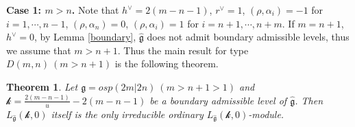 \documentclass[12pt]{article}
\newtheorem{thm}{Theorem}[section]
\begin{document}
{\bf Case 1: $m>n$.}
Note that $h^{\vee}=2(m-n-1)$, $r^\vee=1$,
$(\rho, \alpha_i)=-1$ for $i=1,\cdots,n-1$, $(\rho, \alpha_n)=0$,
$(\rho, \alpha_i)=1$ for $i=n+1,\cdots,n+m$.
If $m=n+1$, $h^{\vee}=0$, by Lemma \ref{boundary}, $\widehat{\mathfrak{g}}$ does not admit boundary admissible levels,
thus we assume that $m>n+1$.
Thus the main result for type $D(m,n)~(m>n+1)$ is the following theorem.
\begin{thm}
Let $\mathfrak{g}=osp(2m|2n)~(m>n+1>1)$ and
$\mathcal{k}=\frac{2(m-n-1)}{u}-2(m-n-1)$ be a boundary admissible level of $\widehat{\mathfrak{g}}$.
Then $L_{\widehat{\mathfrak{g}}}(\mathcal{k},0)$ itself is the only irreducible ordinary $L_{\widehat{\mathfrak{g}}}(\mathcal{k},0)$-module.
\end{thm}
\end{document}
